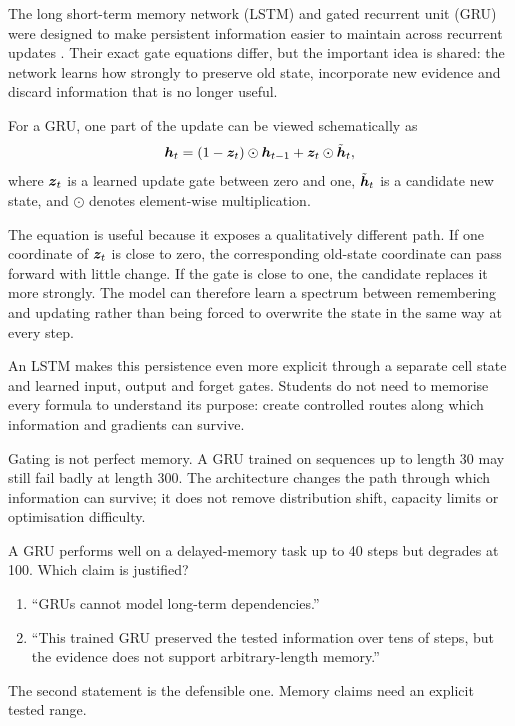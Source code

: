 The long short-term memory network (LSTM) and gated recurrent unit (GRU) were designed to make persistent information easier to maintain across recurrent updates \parencite{hochreiter1997,cho2014}. Their exact gate equations differ, but the important idea is shared: the network learns how strongly to preserve old state, incorporate new evidence and discard information that is no longer useful.

For a GRU, one part of the update can be viewed schematically as
\begin{equation}
  \bm{h}_t
  = (1-\bm{z}_t)\odot\bm{h}_{t-1}
  + \bm{z}_t\odot\tilde{\bm{h}}_t,
  \label{eq:week7-gru-update}
\end{equation}
where \(\bm{z}_t\) is a learned update gate between zero and one, \(\tilde{\bm{h}}_t\) is a candidate new state, and \(\odot\) denotes element-wise multiplication.

The equation is useful because it exposes a qualitatively different path. If one coordinate of \(\bm{z}_t\) is close to zero, the corresponding old-state coordinate can pass forward with little change. If the gate is close to one, the candidate replaces it more strongly. The model can therefore learn a spectrum between remembering and updating rather than being forced to overwrite the state in the same way at every step.

An LSTM makes this persistence even more explicit through a separate cell state and learned input, output and forget gates. Students do not need to memorise every formula to understand its purpose: create controlled routes along which information and gradients can survive.

Gating is not perfect memory. A GRU trained on sequences up to length 30 may still fail badly at length 300. The architecture changes the path through which information can survive; it does not remove distribution shift, capacity limits or optimisation difficulty.

\begin{checkpointbox}
A GRU performs well on a delayed-memory task up to 40 steps but degrades at 100. Which claim is justified?

\begin{enumerate}[leftmargin=*]
  \item ``GRUs cannot model long-term dependencies.''
  \item ``This trained GRU preserved the tested information over tens of steps, but the evidence does not support arbitrary-length memory.''
\end{enumerate}
The second statement is the defensible one. Memory claims need an explicit tested range.
\end{checkpointbox}

